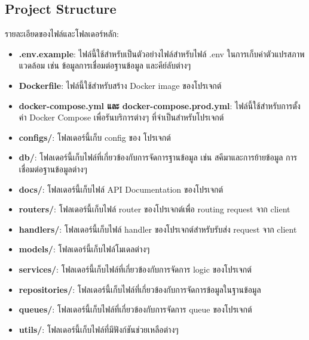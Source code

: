 \subsection{Project Structure}
รายละเอียดของไฟล์และโฟลเดอร์หลัก:
\begin{itemize}
    \item \textbf{.env.example}: ไฟล์นี้ใช้สำหรับเป็นตัวอย่างไฟล์สำหรับไฟล์ .env ในการเก็บค่าตัวแปรสภาพแวดล้อม เช่น ข้อมูลการเชื่อมต่อฐานข้อมูล และคีย์ลับต่างๆ
    \item \textbf{Dockerfile}: ไฟล์นี้ใช้สำหรับสร้าง Docker image ของโปรเจกต์
    \item \textbf{docker-compose.yml และ docker-compose.prod.yml}: ไฟล์นี้ใช้สำหรับการตั้งค่า Docker Compose เพื่อรันบริการต่างๆ ที่จำเป็นสำหรับโปรเจกต์
    \item \textbf{configs/}: โฟลเดอร์นี้เก็บ config ของ โปรเจกต์
    \item \textbf{db/}: โฟลเดอร์นี้เก็บไฟล์ที่เกี่ยวข้องกับการจัดการฐานข้อมูล เช่น สคีมาและการย้ายข้อมูล การเชื่อมต่อฐานข้อมูลต่างๆ
    \item \textbf{docs/}: โฟลเดอร์นี้เก็บไฟล์ API Documentation ของโปรเจกต์
    \item \textbf{routers/}: โฟลเดอร์นี้เก็บไฟล์ router ของโปรเจกต์เพื่อ routing request จาก client
    \item \textbf{handlers/}: โฟลเดอร์นี้เก็บไฟล์ handler ของโปรเจกต์สำหรับรับส่ง request จาก client
    \item \textbf{models/}: โฟลเดอร์นี้เก็บไฟล์โมเดลต่างๆ
    \item \textbf{services/}: โฟลเดอร์นี้เก็บไฟล์ที่เกี่ยวข้องกับการจัดการ logic ของโปรเจกต์
    \item \textbf{repositories/}: โฟลเดอร์นี้เก็บไฟล์ที่เกี่ยวข้องกับการจัดการข้อมูลในฐานข้อมูล
    \item \textbf{queues/}: โฟลเดอร์นี้เก็บไฟล์ที่เกี่ยวข้องกับการจัดการ queue ของโปรเจกต์
    \item \textbf{utils/}: โฟลเดอร์นี้เก็บไฟล์ที่มีฟังก์ชันช่วยเหลือต่างๆ
\end{itemize}

